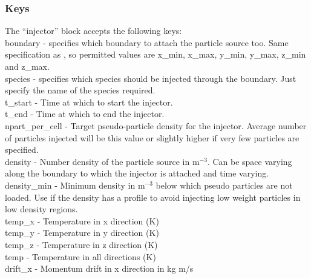 \subsubsection{Keys}

The ``injector'' block accepts the following keys:\\

{\emphtext boundary} - specifies which boundary to attach the particle source
  too. Same specification as , so permitted values are
  x\_min, x\_max, y\_min, y\_max, z\_min and z\_max.\\

{\emphtext species} - specifies which species should be injected through the
  boundary. Just specify the name of the species required.\\

{\emphtext t\_start} - Time at which to start the injector.\\

{\emphtext t\_end} - Time at which to end the injector.\\

{\emphtext npart\_per\_cell} - Target pseudo-particle density for the
  injector. Average number of particles injected will be this value or slightly
  higher if very few particles are specified.\\

{\emphtext density} - Number density of the particle source in m$^{-3}$. Can
  be space varying along the boundary to which the injector is attached and
  time varying.\\

{\emphtext density\_min} - Minimum density in m$^{-3}$ below which pseudo
  particles are not loaded. Use if the density has a profile to avoid
  injecting low weight particles in low density regions.\\

{\emphtext temp\_x} - Temperature in x direction (K)\\

{\emphtext temp\_y} - Temperature in y direction (K)\\

{\emphtext temp\_z} - Temperature in z direction (K)\\

{\emphtext temp} - Temperature in all directions (K)\\

{\emphtext drift\_x} - Momentum drift in x direction in kg m/s\\

